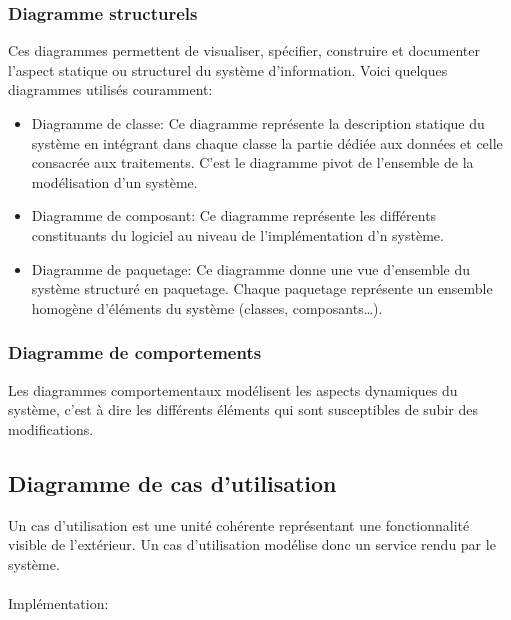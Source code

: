 		\subsubsection{Diagramme structurels}
			Ces diagrammes permettent de visualiser, spécifier, construire et documenter l'aspect statique ou structurel du système d'information. Voici quelques diagrammes utilisés couramment:\\
			\begin{itemize}
				\item Diagramme de classe: Ce diagramme représente la description statique du système en intégrant dans chaque classe la partie dédiée aux données et celle consacrée aux traitements. C’est le diagramme pivot de l’ensemble de la modélisation d’un système.\cite{definition_diagramme_classe}\\
				
				\item Diagramme de composant: Ce diagramme représente
				les différents constituants du logiciel au niveau de l’implémentation d’n système.\cite{definition_diagramme_composant}\\
				
				\item Diagramme de paquetage: Ce diagramme donne une
				vue d’ensemble du système structuré en paquetage. Chaque paquetage représente un ensemble homogène d’éléments du système (classes, composants…).\cite{definition_diagramme_paquetage}\\
			\end{itemize}
		\subsubsection{Diagramme de comportements}
			Les diagrammes comportementaux modélisent les aspects dynamiques du système, c'est à dire les différents éléments qui sont susceptibles de subir des modifications.\\
		\subsection{Diagramme de cas d'utilisation}
		Un cas d'utilisation est une unité cohérente représentant une fonctionnalité visible de l'extérieur. Un cas d'utilisation modélise donc un service rendu par le système.\cite{cas_d_utilisation}\\
		\\Implémentation:\\
